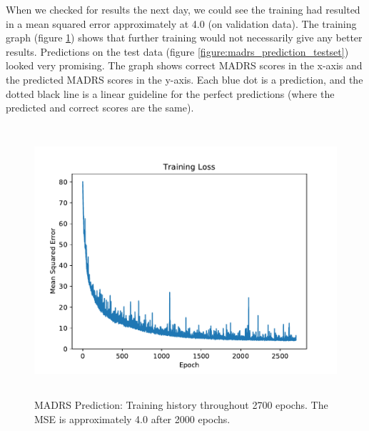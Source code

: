 When we checked for results the next day, we could see the training had resulted in a mean squared error approximately at 4.0 (on validation data). The training graph (figure \ref{figure:madrs_prediction_history}) shows that further training would not necessarily give any better results. Predictions on the test data (figure \ref{figure:madrs_prediction_testset}) looked very promising. The graph shows correct MADRS scores in the x-axis and the predicted MADRS scores in the y-axis. Each blue dot is a prediction, and the dotted black line is a linear guideline for the perfect predictions (where the predicted and correct scores are the same). 

\begin{figure}
\begin{center}
      \includegraphics[height=10cm]{img/madrs_prediction/train_history.pdf}
      \caption{MADRS Prediction: Training history throughout 2700 epochs. The MSE is approximately 4.0 after 2000 epochs.}
      \label{figure:madrs_prediction_history}
\end{center}
\end{figure}

